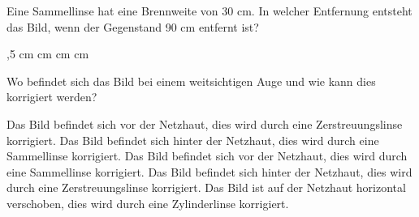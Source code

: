\documentclass[11pt]{exam}
\begin{document}
\begin{questions}
\vspace{3mm}\question Eine Sammellinse hat eine Brennweite von 30 cm. In welcher Entfernung entsteht das Bild, wenn der Gegenstand 90 cm entfernt ist?

\begin{choices}
	,5 cm
	 cm
	\choice 45cm
	 cm
	 cm
\end{choices}

\vspace{3mm}\question Wo befindet sich das Bild bei einem weitsichtigen Auge und wie kann dies korrigiert werden?

\begin{choices}
	\choice Das Bild befindet sich vor der Netzhaut, dies wird durch eine Zerstreuungslinse korrigiert.
	\choice Das Bild befindet sich hinter der Netzhaut, dies wird durch eine Sammellinse korrigiert.
	\choice Das Bild befindet sich vor der Netzhaut, dies wird durch eine Sammellinse korrigiert.
	\choice Das Bild befindet sich hinter der Netzhaut, dies wird durch eine Zerstreuungslinse korrigiert.
	\choice Das Bild ist auf der Netzhaut horizontal verschoben, dies wird durch eine Zylinderlinse korrigiert.
\end{choices}

\vspace{3mm}\end{questions}
\end{document}
